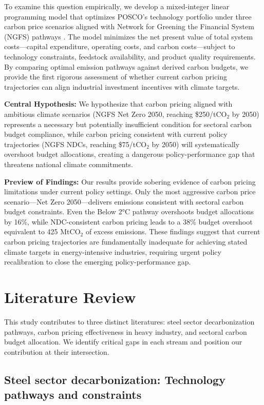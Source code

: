 \documentclass[preprint,5p,authoryear]{elsarticle}
\begin{document}
To examine this question empirically, we develop a mixed-integer linear programming model that optimizes POSCO's technology portfolio under three carbon price scenarios aligned with Network for Greening the Financial System (NGFS) pathways \citep{NGFS2024}. The model minimizes the net present value of total system costs—capital expenditure, operating costs, and carbon costs—subject to technology constraints, feedstock availability, and product quality requirements. By comparing optimal emission pathways against derived carbon budgets, we provide the first rigorous assessment of whether current carbon pricing trajectories can align industrial investment incentives with climate targets.

\textbf{Central Hypothesis:} We hypothesize that carbon pricing aligned with ambitious climate scenarios (NGFS Net Zero 2050, reaching \$250/tCO$_2$ by 2050) represents a necessary but potentially insufficient condition for sectoral carbon budget compliance, while carbon pricing consistent with current policy trajectories (NGFS NDCs, reaching \$75/tCO$_2$ by 2050) will systematically overshoot budget allocations, creating a dangerous policy-performance gap that threatens national climate commitments.

\textbf{Preview of Findings:} Our results provide sobering evidence of carbon pricing limitations under current policy settings. Only the most aggressive carbon price scenario—Net Zero 2050—delivers emissions consistent with sectoral carbon budget constraints. Even the Below 2°C pathway overshoots budget allocations by 16\%, while NDC-consistent carbon pricing leads to a 38\% budget overshoot equivalent to 425 MtCO$_2$ of excess emissions. These findings suggest that current carbon pricing trajectories are fundamentally inadequate for achieving stated climate targets in energy-intensive industries, requiring urgent policy recalibration to close the emerging policy-performance gap.

\section{Literature Review}

This study contributes to three distinct literatures: steel sector decarbonization pathways, carbon pricing effectiveness in heavy industry, and sectoral carbon budget allocation. We identify critical gaps in each stream and position our contribution at their intersection.

\subsection{Steel sector decarbonization: Technology pathways and constraints}
\end{document}
